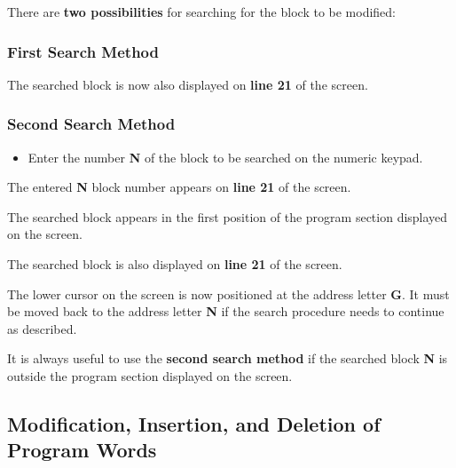 There are \textbf{two possibilities} for searching for the block to be modified:

\subsubsection*{First Search Method}

\begin{itemize}
\end{itemize}

The searched block is now also displayed on \textbf{line 21} of the screen.

\subsubsection*{Second Search Method}

\begin{itemize}
    \item Enter the number \textbf{N} of the block to be searched on the numeric keypad.
\end{itemize}

\begin{itemize}
\end{itemize}

The entered \textbf{N} block number appears on \textbf{line 21} of the screen.

\begin{itemize}
\end{itemize}

The searched block appears in the first position of the program section displayed on the screen.

The searched block is also displayed on \textbf{line 21} of the screen.

The lower cursor on the screen is now positioned at the address letter \textbf{G}.  
It must be moved back to the address letter \textbf{N} if the search procedure needs to continue as described.

\notes

It is always useful to use the \textbf{second search method} if the searched block \textbf{N} is outside the program section displayed on the screen.

\subsection{Modification, Insertion, and Deletion of Program Words}

